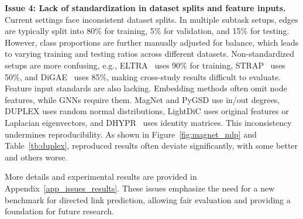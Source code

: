 \textbf{Issue 4: Lack of standardization in dataset splits and feature inputs.}
Current settings face inconsistent dataset splits. In multiple subtask setups, edges are typically split into 80\% for training, 5\% for validation, and 15\% for testing. However, class proportions are further manually adjusted for balance, which leads to varying training and testing ratios across different datasets. Non-standardized setups are more confusing, e.g., ELTRA~\cite{eltra} uses 90\% for training, STRAP~\cite{strap} uses 50\%, and DiGAE~\cite{digae} uses 85\%, making cross-study results difficult to evaluate.
Feature input standards are also lacking. Embedding methods often omit node features, while GNNs require them. MagNet and PyGSD use in/out degrees, DUPLEX uses random normal distributions, LightDiC uses original features or Laplacian eigenvectors, and DHYPR~\cite{dhypr} uses identity matrices. This inconsistency undermines reproducibility. As shown in Figure~\ref{fig:magnet_mlp} and Table~\ref{tb:duplex}, reproduced results often deviate significantly, with some better and others worse.

More details and experimental results are provided in Appendix~\ref{app_issues_results}. These issues emphasize the need for a new benchmark for directed link prediction, allowing fair evaluation and providing a foundation for future research.











